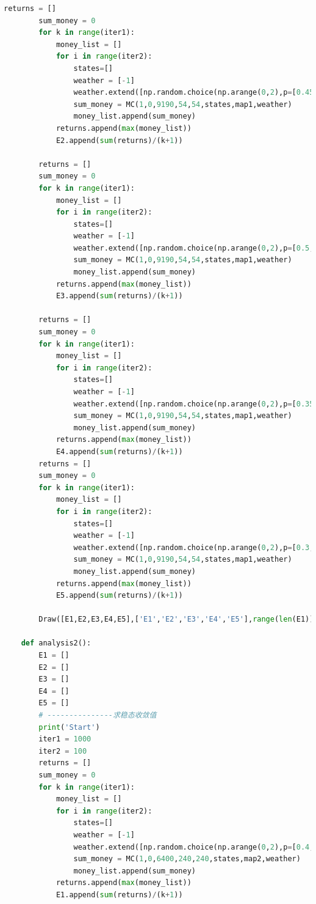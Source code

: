 \documentclass[withoutpreface,bwprint]{cumcmthesis} %
\begin{document}
\begin{appendices}
\begin{lstlisting}[language=python]
        returns = []
        sum_money = 0
        for k in range(iter1):
            money_list = []
            for i in range(iter2):
                states=[]
                weather = [-1]
                weather.extend([np.random.choice(np.arange(0,2),p=[0.45,0.55]) for _ in range(10)])
                sum_money = MC(1,0,9190,54,54,states,map1,weather)
                money_list.append(sum_money)
            returns.append(max(money_list))
            E2.append(sum(returns)/(k+1))
    
        returns = []
        sum_money = 0
        for k in range(iter1):
            money_list = []
            for i in range(iter2):
                states=[]
                weather = [-1]
                weather.extend([np.random.choice(np.arange(0,2),p=[0.5,0.5]) for _ in range(10)])
                sum_money = MC(1,0,9190,54,54,states,map1,weather)
                money_list.append(sum_money)
            returns.append(max(money_list))
            E3.append(sum(returns)/(k+1))
    
        returns = []
        sum_money = 0
        for k in range(iter1):
            money_list = []
            for i in range(iter2):
                states=[]
                weather = [-1]
                weather.extend([np.random.choice(np.arange(0,2),p=[0.35,0.65]) for _ in range(10)])
                sum_money = MC(1,0,9190,54,54,states,map1,weather)
                money_list.append(sum_money)
            returns.append(max(money_list))
            E4.append(sum(returns)/(k+1))
        returns = []
        sum_money = 0
        for k in range(iter1):
            money_list = []
            for i in range(iter2):
                states=[]
                weather = [-1]
                weather.extend([np.random.choice(np.arange(0,2),p=[0.3,0.7]) for _ in range(10)])
                sum_money = MC(1,0,9190,54,54,states,map1,weather)
                money_list.append(sum_money)
            returns.append(max(money_list))
            E5.append(sum(returns)/(k+1))
    
        Draw([E1,E2,E3,E4,E5],['E1','E2','E3','E4','E5'],range(len(E1)),"")
    
    def analysis2():
        E1 = []
        E2 = []
        E3 = []
        E4 = []
        E5 = []
        # ---------------求稳态收敛值
        print('Start')
        iter1 = 1000
        iter2 = 100
        returns = []
        sum_money = 0
        for k in range(iter1):
            money_list = []
            for i in range(iter2):
                states=[]
                weather = [-1]
                weather.extend([np.random.choice(np.arange(0,2),p=[0.4,0.6]) for _ in range(10)])
                sum_money = MC(1,0,6400,240,240,states,map2,weather)
                money_list.append(sum_money)
            returns.append(max(money_list))
            E1.append(sum(returns)/(k+1))
        

\end{lstlisting}
\end{appendices}
\end{document}
